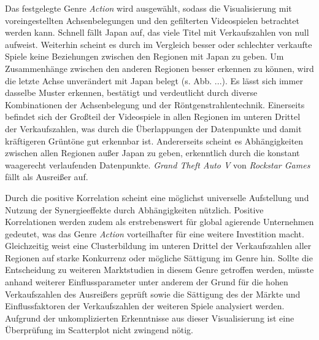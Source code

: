 \documentclass[usegeometry=true]{scrartcl}
\begin{document}
Das festgelegte Genre \textit{Action} wird ausgewählt, sodass die Visualisierung mit voreingestellten Achsenbelegungen 
und den gefilterten Videospielen betrachtet werden kann. 
Schnell fällt Japan auf, das viele Titel mit Verkaufszahlen von null aufweist. 
Weiterhin scheint es durch im Vergleich besser oder schlechter verkaufte Spiele keine Beziehungen zwischen den Regionen mit Japan zu geben.
Um Zusammenhänge zwischen den anderen Regionen besser erkennen zu können, wird die letzte Achse unverändert mit Japan belegt (s. Abb. ...).
Es lässt sich immer dasselbe Muster erkennen, bestätigt und verdeutlicht durch diverse Kombinationen der Achsenbelegung und der Röntgenstrahlentechnik.
Einerseits befindet sich der Großteil der Videospiele in allen Regionen im unteren Drittel der Verkaufszahlen, was durch die Überlappungen der Datenpunkte und damit kräftigeren Grüntöne gut erkennbar ist.
Andererseits scheint es Abhängigkeiten zwischen allen Regionen außer Japan zu geben, erkenntlich durch die konstant waagerecht verlaufenden Datenpunkte.
\textit{Grand Theft Auto V} von \textit{Rockstar Games} fällt als Ausreißer auf. 

Durch die positive Korrelation scheint eine möglichst universelle Aufstellung und Nutzung der Synergieeffekte durch Abhängigkeiten nützlich.
Positive Korrelationen werden zudem als erstrebenswert für global agierende Unternehmen gedeutet, was das Genre \textit{Action} vorteilhafter für eine weitere Investition macht.
Gleichzeitig weist eine Clusterbildung im unteren Drittel der Verkaufszahlen aller Regionen auf starke Konkurrenz oder mögliche Sättigung im Genre hin. 
Sollte die Entscheidung zu weiteren Marktstudien in diesem Genre getroffen werden, 
müsste anhand weiterer Einflussparameter unter anderem der Grund für die hohen Verkaufszahlen des Ausreißers geprüft sowie die Sättigung des der Märkte und Einflussfaktoren der Verkaufszahlen der weiteren Spiele analysiert werden.
Aufgrund der unkomplizierten Erkenntnisse aus dieser Visualisierung ist eine Überprüfung im Scatterplot nicht zwingend nötig.
\end{document}
